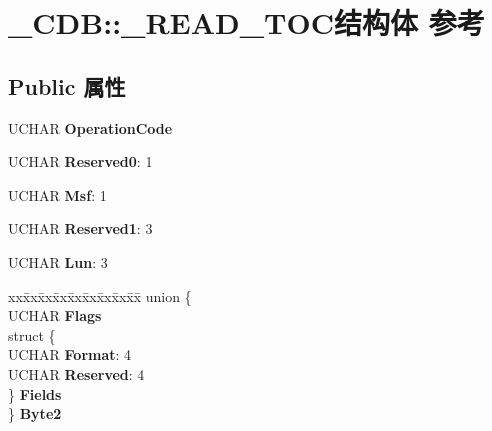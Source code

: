\hypertarget{struct___c_d_b_1_1___r_e_a_d___t_o_c}{}\section{\+\_\+\+C\+DB\+:\+:\+\_\+\+R\+E\+A\+D\+\_\+\+T\+O\+C结构体 参考}
\label{struct___c_d_b_1_1___r_e_a_d___t_o_c}
\subsection*{Public 属性}
\begin{DoxyCompactItemize}
\item 
\mbox{\label{struct___c_d_b_1_1___r_e_a_d___t_o_c_a0fc535d6272ed52b973898b3ae672a91}} 
U\+C\+H\+AR {\bfseries Operation\+Code}
\item 
\mbox{\label{struct___c_d_b_1_1___r_e_a_d___t_o_c_ac27b6e1370968370c14ac85f767a8e14}} 
U\+C\+H\+AR {\bfseries Reserved0}\+: 1
\item 
\mbox{\label{struct___c_d_b_1_1___r_e_a_d___t_o_c_ad4928461cf30c36ca95395c9508e6ec6}} 
U\+C\+H\+AR {\bfseries Msf}\+: 1
\item 
\mbox{\label{struct___c_d_b_1_1___r_e_a_d___t_o_c_a2ce742175e6e79cf31d8d3fa82dc1fbd}} 
U\+C\+H\+AR {\bfseries Reserved1}\+: 3
\item 
\mbox{\label{struct___c_d_b_1_1___r_e_a_d___t_o_c_a220c9c99ff0226fd55e677a2fab0593b}} 
U\+C\+H\+AR {\bfseries Lun}\+: 3
\item 
\mbox{\label{struct___c_d_b_1_1___r_e_a_d___t_o_c_add406cb9bc9e6e53625dc5993670e197}} 
\begin{tabbing}
xx\=xx\=xx\=xx\=xx\=xx\=xx\=xx\=xx\=\kill
union \{\\
\>UCHAR {\bfseries Flags}\\
\>struct \{\\
\>\>UCHAR {\bfseries Format}: 4\\
\>\>UCHAR {\bfseries Reserved}: 4\\
\>\} {\bfseries Fields}\\
\} {\bfseries Byte2}\\


\end{tabbing}
\end{DoxyCompactItemize}
